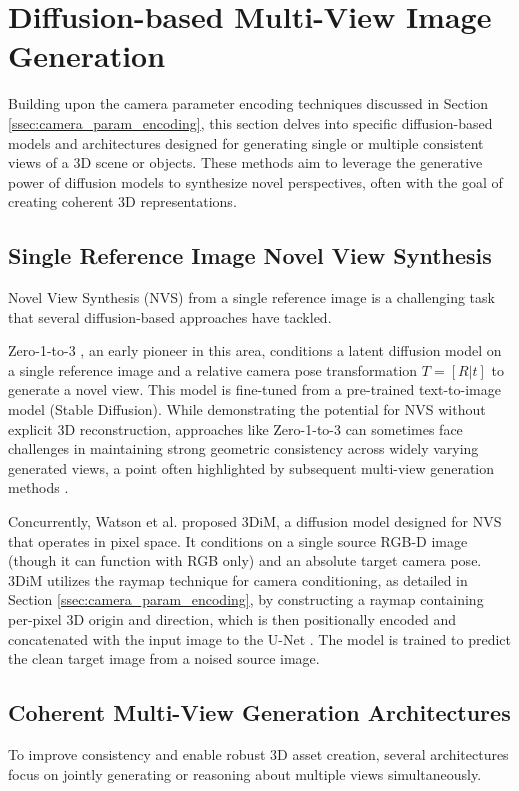 \section{Diffusion-based Multi-View Image Generation}\label{sec:multi-view-diffusion}

Building upon the camera parameter encoding techniques discussed in Section \ref{ssec:camera_param_encoding}, this section delves into specific diffusion-based models and architectures designed for generating single or multiple consistent views of a 3D scene or objects. These methods aim to leverage the generative power of diffusion models to synthesize novel perspectives, often with the goal of creating coherent 3D representations.

\subsection{Single Reference Image Novel View Synthesis}
Novel View Synthesis (NVS) from a single reference image is a challenging task that several diffusion-based approaches have tackled.

Zero-1-to-3 \cite{zero1to3}, an early pioneer in this area, conditions a latent diffusion model on a single reference image and a relative camera pose transformation \(T=[R|t]\) to generate a novel view. This model is fine-tuned from a pre-trained text-to-image model (Stable Diffusion). While demonstrating the potential for NVS without explicit 3D reconstruction, approaches like Zero-1-to-3 can sometimes face challenges in maintaining strong geometric consistency across widely varying generated views, a point often highlighted by subsequent multi-view generation methods \cite{imagedream, cat3d}.

Concurrently, Watson et al. \cite{novelviewsynthesisdiffusion} proposed 3DiM, a diffusion model designed for NVS that operates in pixel space. It conditions on a single source RGB-D image (though it can function with RGB only) and an absolute target camera pose. 3DiM utilizes the raymap technique for camera conditioning, as detailed in Section \ref{ssec:camera_param_encoding}, by constructing a raymap containing per-pixel 3D origin and direction, which is then positionally encoded and concatenated with the input image to the U-Net \cite{novelviewsynthesisdiffusion}. The model is trained to predict the clean target image from a noised source image.

\subsection{Coherent Multi-View Generation Architectures}
To improve consistency and enable robust 3D asset creation, several architectures focus on jointly generating or reasoning about multiple views simultaneously.

